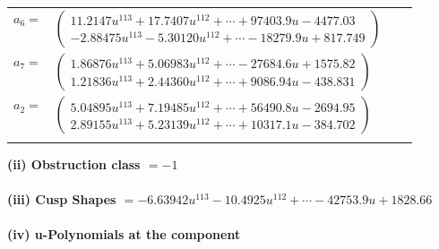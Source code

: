\documentclass[1p]{elsarticle_modified}
\theoremstyle{definition}
\begin{document}
\begin{tabular}{m{7pt} m{180pt} m{7pt} m{180pt} }
\flushright $a_{6}=$&$\begin{pmatrix}11.2147 u^{113}+17.7407 u^{112}+\cdots+97403.9 u-4477.03\\-2.88475 u^{113}-5.30120 u^{112}+\cdots-18279.9 u+817.749\end{pmatrix}$ \\
\flushright $a_{7}=$&$\begin{pmatrix}1.86876 u^{113}+5.06983 u^{112}+\cdots-27684.6 u+1575.82\\1.21836 u^{113}+2.44360 u^{112}+\cdots+9086.94 u-438.831\end{pmatrix}$ \\
\flushright $a_{2}=$&$\begin{pmatrix}5.04895 u^{113}+7.19485 u^{112}+\cdots+56490.8 u-2694.95\\2.89155 u^{113}+5.23139 u^{112}+\cdots+10317.1 u-384.702\end{pmatrix}$\\&\end{tabular}
\flushleft \textbf{(ii) Obstruction class $= -1$}\\~\\
\flushleft \textbf{(iii) Cusp Shapes $= -6.63942 u^{113}-10.4925 u^{112}+\cdots-42753.9 u+1828.66$}\\~\\
\newpage\renewcommand{\arraystretch}{1}
\flushleft \textbf{(iv) u-Polynomials at the component}\newline \\
\end{document}
